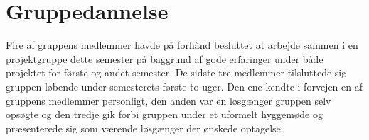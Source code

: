 \section{Gruppedannelse}

Fire af gruppens medlemmer havde på forhånd besluttet at arbejde sammen i en projektgruppe dette semester på baggrund af gode erfaringer under både projektet for første og andet semester. De sidste tre medlemmer tilsluttede sig gruppen løbende under semesterets første to uger. Den ene kendte i forvejen en af gruppens medlemmer personligt, den anden var en løsgænger gruppen selv opsøgte og den tredje gik forbi gruppen under et uformelt hyggemøde og præsenterede sig som værende løsgænger der ønskede optagelse.